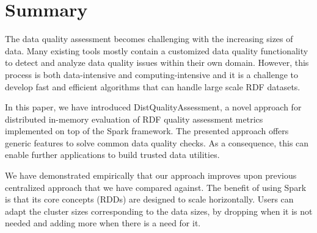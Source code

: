 \section{Summary}
\label{sec:distqualityassesment-summary}
The data quality assessment becomes challenging with the increasing sizes of data.
Many existing tools mostly contain a customized data quality functionality to detect and analyze data quality issues within their own domain. 
However, this process is both data-intensive and computing-intensive and it is a challenge to develop fast and efficient algorithms that can handle large scale RDF datasets.

In this paper, we have introduced DistQualityAssessment, a novel approach for distributed in-memory evaluation of RDF quality assessment metrics implemented on top of the Spark framework.
The presented approach offers generic features to solve common data quality checks.
As a consequence, this can enable further applications to build trusted data utilities. 

We have demonstrated empirically that our approach improves upon previous centralized approach that we have compared against.
The benefit of using Spark is that its core concepts (RDDs) are designed to scale horizontally. Users can adapt the cluster sizes corresponding to the data sizes, by dropping when it is not needed and adding more when there is a need for it.